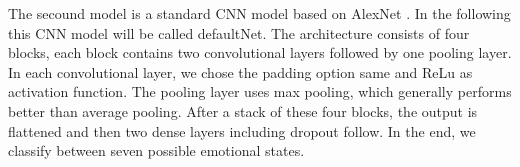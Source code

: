 \documentclass[a4paper, conference]{IEEEtran}
\begin{document}
The secound model is a standard CNN model based on AlexNet \cite{krizhevskyImagenetClassificationDeep2012}. In the following this CNN model will be called defaultNet. %
The architecture consists of four blocks, each block contains two convolutional layers followed by one pooling layer. In each convolutional layer, we chose the padding option same and ReLu as activation function. The pooling layer uses max pooling, which generally performs better than average pooling. After a stack of these four blocks, the output is flattened and then two dense layers including dropout follow. In the end, we classify between seven possible emotional states.
\end{document}
